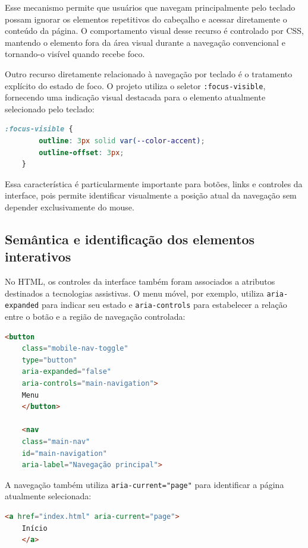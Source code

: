 Esse mecanismo permite que usuários que navegam principalmente pelo teclado possam ignorar os elementos repetitivos do cabeçalho e acessar diretamente o conteúdo da página. O comportamento visual desse recurso é controlado por CSS, mantendo o elemento fora da área visual durante a navegação convencional e tornando-o visível quando recebe foco.

Outro recurso diretamente relacionado à navegação por teclado é o tratamento explícito do estado de foco. O projeto utiliza o seletor \texttt{:focus-visible}, fornecendo uma indicação visual destacada para o elemento atualmente selecionado pelo teclado:

\begin{lstlisting}[language=CSS, caption={Indicação visual do elemento em foco.}, label={lst:focus}]
	:focus-visible {
		outline: 3px solid var(--color-accent);
		outline-offset: 3px;
	}
\end{lstlisting}

Essa característica é particularmente importante para botões, links e controles da interface, pois permite identificar visualmente a posição atual da navegação sem depender exclusivamente do mouse.

\vspace{5mm}
\subsection{Semântica e identificação dos elementos interativos}

No HTML, os controles da interface também foram associados a atributos destinados a tecnologias assistivas. O menu móvel, por exemplo, utiliza \texttt{aria-expanded} para indicar seu estado e \texttt{aria-controls} para estabelecer a relação entre o botão e a região de navegação controlada:

\begin{lstlisting}[language=HTML, caption={Identificação do controle da navegação móvel.}, label={lst:mobilearia}]
	<button
	class="mobile-nav-toggle"
	type="button"
	aria-expanded="false"
	aria-controls="main-navigation">
	Menu
	</button>
	
	<nav
	class="main-nav"
	id="main-navigation"
	aria-label="Navegação principal">
\end{lstlisting}

A navegação também utiliza \texttt{aria-current="page"} para identificar a página atualmente selecionada:

\begin{lstlisting}[language=HTML, caption={Identificação da página atual na navegação.}, label={lst:ariacurrent}]
	<a href="index.html" aria-current="page">
	Início
	</a>
\end{lstlisting}

